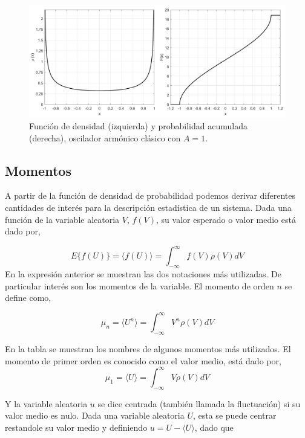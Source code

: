 \documentclass[executivepaper,12pt]{article}
\numberwithin{equation}{section}
\begin{document}
 \begin{figure}[H]
 	\begin{center}
 		\includegraphics[scale=0.6]{probabilidad3}
 	\end{center}
 	\caption{Función de densidad (izquierda) y probabilidad acumulada (derecha), oscilador armónico clásico con $A=1$.}
 	\label{fig-prob3}
 \end{figure}
 
 \subsection{Momentos}
 
A partir de la función de densidad de probabilidad podemos derivar diferentes cantidades de interés para la descripción estadística de un sistema. Dada una función de la variable aleatoria $V$, $f(V)$, su valor esperado o valor medio está dado por,


\begin{equation}
	E\{ f(U) \}=\langle f(U) \rangle = \int_{-\infty}^{\infty} f(V) \rho(V)dV 
\end{equation}
 En la expresión anterior se muestran las dos notaciones más utilizadas. De particular interés son los momentos de la variable. El momento de orden $n$ se define como,
 
\begin{equation}
	\mu_n=\langle U^n \rangle = \int_{-\infty}^{\infty} V^n \rho(V)dV 
\end{equation} 
 
 En la tabla se muestran los nombres de algunos momentos más utilizados. El momento de primer orden es conocido como el valor medio, está dado por,
 \begin{equation}
 	\mu_1=\langle U\rangle=\int_{-\infty}^{\infty} V \rho(V)dV 
 \end{equation}
 
 Y la variable aleatoria $u$ se dice centrada (también llamada la fluctuación) si su valor medio es nulo. Dada una variable aleatoria $U$, esta se puede centrar restandole su valor medio y definiendo $u=U-\langle U\rangle$, dado que 
 
\end{document}

